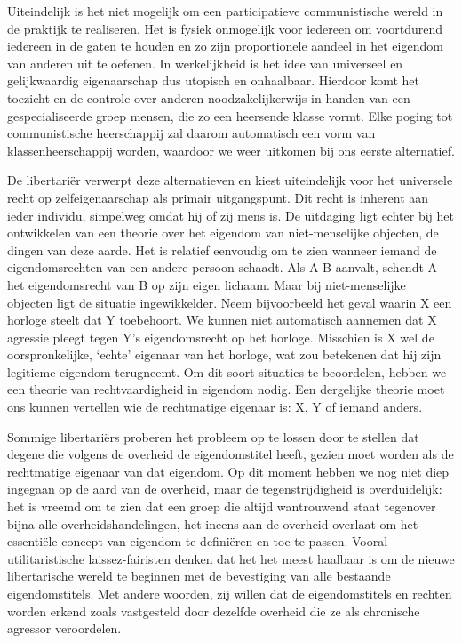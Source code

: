\documentclass[
  a5paper,
  smalldemyvopaper,10pt,twoside,onecolumn,openright,extrafontsizes,hidelinks]{memoir}
\begin{document}
Uiteindelijk is het niet mogelijk om een participatieve communistische
wereld in de praktijk te realiseren. Het is fysiek onmogelijk voor
iedereen om voortdurend iedereen in de gaten te houden en zo zijn
proportionele aandeel in het eigendom van anderen uit te oefenen. In
werkelijkheid is het idee van universeel en gelijkwaardig eigenaarschap
dus utopisch en onhaalbaar. Hierdoor komt het toezicht en de controle
over anderen noodzakelijkerwijs in handen van een gespecialiseerde groep
mensen, die zo een heersende klasse vormt. Elke poging tot
communistische heerschappij zal daarom automatisch een vorm van
klassenheerschappij worden, waardoor we weer uitkomen bij ons eerste
alternatief.

De libertariër verwerpt deze alternatieven en kiest uiteindelijk voor
het universele recht op zelfeigenaarschap als primair uitgangspunt. Dit
recht is inherent aan ieder individu, simpelweg omdat hij of zij mens
is. De uitdaging ligt echter bij het ontwikkelen van een theorie over
het eigendom van niet-menselijke objecten, de dingen van deze aarde. Het
is relatief eenvoudig om te zien wanneer iemand de eigendomsrechten van
een andere persoon schaadt. Als A B aanvalt, schendt A het
eigendomsrecht van B op zijn eigen lichaam. Maar bij niet-menselijke
objecten ligt de situatie ingewikkelder. Neem bijvoorbeeld het geval
waarin X een horloge steelt dat Y toebehoort. We kunnen niet automatisch
aannemen dat X agressie pleegt tegen Y's eigendomsrecht op het horloge.
Misschien is X wel de oorspronkelijke, `echte' eigenaar van het horloge,
wat zou betekenen dat hij zijn legitieme eigendom terugneemt. Om dit
soort situaties te beoordelen, hebben we een theorie van
rechtvaardigheid in eigendom nodig. Een dergelijke theorie moet ons
kunnen vertellen wie de rechtmatige eigenaar is: X, Y of iemand anders.

Sommige libertariërs proberen het probleem op te lossen door te stellen
dat degene die volgens de overheid de eigendomstitel heeft, gezien moet
worden als de rechtmatige eigenaar van dat eigendom. Op dit moment
hebben we nog niet diep ingegaan op de aard van de overheid, maar de
tegenstrijdigheid is overduidelijk: het is vreemd om te zien dat een
groep die altijd wantrouwend staat tegenover bijna alle
overheidshandelingen, het ineens aan de overheid overlaat om het
essentiële concept van eigendom te definiëren en toe te passen. Vooral
utilitaristische laissez-fairisten denken dat het het meest haalbaar is
om de nieuwe libertarische wereld te beginnen met de bevestiging van
alle bestaande eigendomstitels. Met andere woorden, zij willen dat de
eigendomstitels en rechten worden erkend zoals vastgesteld door dezelfde
overheid die ze als chronische agressor veroordelen.
\end{document}
